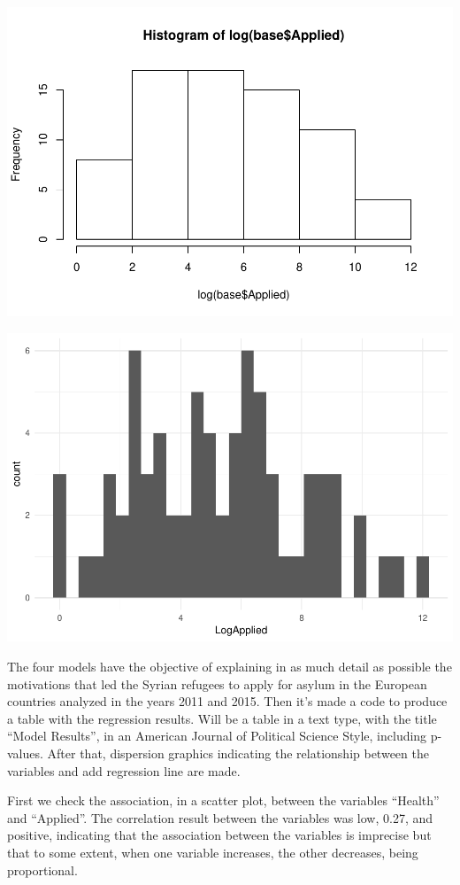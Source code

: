 \documentclass[]{elsarticle} %
\makeatletter
\def\maxwidth{\ifdim\Gin@nat@width>\linewidth\linewidth
\else\Gin@nat@width\fi}
\let\Oldincludegraphics\includegraphics
\renewcommand{\includegraphics}[1]{\Oldincludegraphics[width=\maxwidth]{#1}}
\makeatother
\begin{document}
\includegraphics{stephanie-moura-rmarkdown-tf-ad-ufpe-2018_files/figure-latex/histo_2-1.pdf}

\includegraphics{stephanie-moura-rmarkdown-tf-ad-ufpe-2018_files/figure-latex/base_log-1.pdf}

The four models have the objective of explaining in as much detail as
possible the motivations that led the Syrian refugees to apply for
asylum in the European countries analyzed in the years 2011 and 2015.
Then it's made a code to produce a table with the regression results.
Will be a table in a text type, with the title ``Model Results'', in an
American Journal of Political Science Style, including p-values. After
that, dispersion graphics indicating the relationship between the
variables and add regression line are made.

First we check the association, in a scatter plot, between the variables
``Health'' and ``Applied''. The correlation result between the variables
was low, 0.27, and positive, indicating that the association between the
variables is imprecise but that to some extent, when one variable
increases, the other decreases, being proportional.
\end{document}
